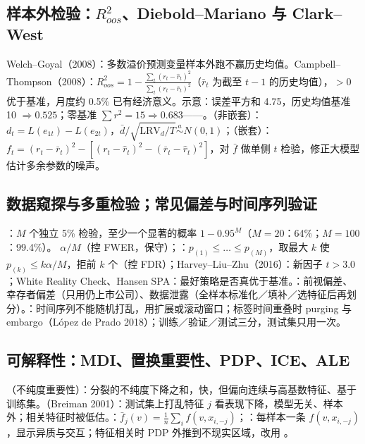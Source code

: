 \subsection{样本外检验：\texorpdfstring{$R^2_{oos}$}{R2oos}、Diebold–Mariano 与 Clark–West}
Welch–Goyal（2008）：多数溢价预测变量样本外跑不赢历史均值。Campbell–Thompson（2008）：$R^2_{oos}=1-\frac{\sum_t(r_t-\hat r_t)^2}{\sum_t(r_t-\bar r_t)^2}$（$\bar r_t$ 为截至 $t-1$ 的历史均值），$>0$ 优于基准，月度约 0.5\% 已有经济意义。示意：误差平方和 4.75，历史均值基准 10 $\Rightarrow0.525$；零基准 $\sum r^2=15\Rightarrow0.683$——。（非嵌套）：$d_t=L(e_{1t})-L(e_{2t})$，$\bar d/\sqrt{\widehat{\mathrm{LRV}}_d/T}\overset{a}{\sim}N(0,1)$；（嵌套）：$f_t=(r_t-\bar r_t)^2-[(r_t-\hat r_t)^2-(\bar r_t-\hat r_t)^2]$，对 $\bar f$ 做单侧 $t$ 检验，修正大模型估计多余参数的噪声。

\subsection{数据窥探与多重检验；常见偏差与时间序列验证}
：$M$ 个独立 5\% 检验，至少一个显著的概率 $1-0.95^M$（$M=20$：64\%；$M=100$：99.4\%）。 $\alpha/M$（控 FWER，保守）；：$p_{(1)}\le\dots\le p_{(M)}$，取最大 $k$ 使 $p_{(k)}\le k\alpha/M$，拒前 $k$ 个（控 FDR）；Harvey–Liu–Zhu（2016）：新因子 $t>3.0$；White Reality Check、Hansen SPA：最好策略是否真优于基准。：前视偏差、幸存者偏差（只用仍上市公司）、数据泄露（全样本标准化／填补／选特征后再划分）。：时间序列不能随机打乱，用扩展或滚动窗口；标签时间重叠时 purging 与 embargo（López de Prado 2018）；训练／验证／测试三分，测试集只用一次。

\subsection{可解释性：MDI、置换重要性、PDP、ICE、ALE}
（不纯度重要性）：分裂的不纯度下降之和，快，但偏向连续与高基数特征、基于训练集。（Breiman 2001）：测试集上打乱特征 $j$ 看表现下降，模型无关、样本外；相关特征时被低估。：$\bar f_j(v)=\frac1n\sum_if(v,x_{i,-j})$；：每样本一条 $f(v,x_{i,-j})$，显示异质与交互；特征相关时 PDP 外推到不现实区域，改用 。

